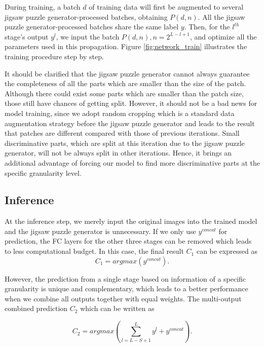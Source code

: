 \documentclass{llncs}
\begin{document}
During training, a batch $d$ of training data will first be augmented to several jigsaw puzzle generator-processed batches, obtaining $P(d, n)$. All the jigsaw puzzle generator-processed batches share the same label $y$. Then, for the $l^{th}$ stage's output ${y}^{l}$, we input the batch $P(d, n),n=2^{L-l+1}$, and optimize all the parameters used in this propagation. Figure \ref{fig:network_train} illustrates the training procedure step by step.

It should be clarified that the jigsaw puzzle generator cannot always guarantee the completeness of all the parts which are smaller than the size of the patch. Although there could exist some parts which are smaller than the patch size, those still have chances of getting split. However, it should not be a bad news for model training, since we adopt random cropping which is a standard data augmentation strategy before the jigsaw puzzle generator and leads to the result that patches are different compared with those of previous iterations. Small discriminative parts, which are split at this iteration due to the jigsaw puzzle generator, will not be always split in other iterations. Hence, it brings an additional advantage of forcing our model to find more discriminative parts at the specific granularity level.

\subsection{Inference}

At the inference step, we merely input the original images into the trained model and the jigsaw puzzle generator is unnecessary. If we only use ${y}^{concat}$ for prediction, the FC layers for the other three stages can be removed which leads to less computational budget. In this case, the final result $C_1$ can be expressed as
\begin{equation}
    C_1 = argmax({y}^{concat}). \label{eq:no4}
\end{equation}

However, the prediction from a single stage based on information of a specific granularity is unique and complementary, which leads to a better performance when we combine all outputs together with equal weights. The multi-output combined prediction $C_2$ which can be written as

\begin{equation}
    C_2 = argmax(\sum_{l=L-S+1}^L {y}^{l} + {y}^{concat}).\label{eq:no3}
\end{equation}
\end{document}
